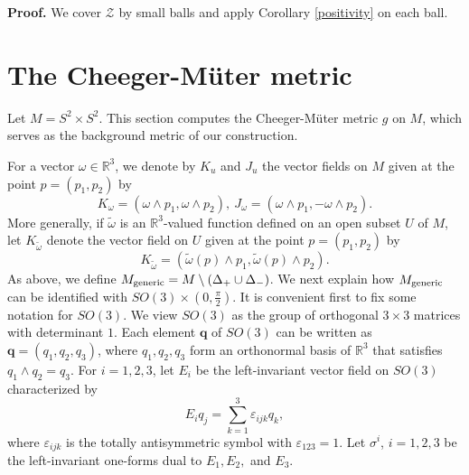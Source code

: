 \documentclass[11pt]{amsart}
\theoremstyle{definition}
\begin{document}
\textbf{Proof.} We cover $\mathcal{Z}$ by small balls and apply Corollary \ref{positivity} on each ball. \\

\section{The Cheeger-M\"uter metric}\label{sec:Mueter.metric}

Let $M = S^2 \times S^2$. This section computes the Cheeger-M\"uter metric $g$ on $M$, which serves as the background metric of our construction.

For a vector $\omega\in\mathbb{R}^3$, we denote by $K_u$ and $J_u$ the vector fields on $M$ given at the point $p=(p_1,p_2)$ by
\[
K_\omega = (\omega\wedge p_1, \omega\wedge p_2),\ J_\omega=(\omega\wedge p_1, -\omega\wedge p_2).
\]
More generally, if $\tilde{\omega}$ is an $\mathbb{R}^3$-valued function defined on an open subset $U$ of $M$, let $K_{\tilde{\omega}}$ denote the vector field on $U$ given at the point $p=(p_1,p_2)$ by
\[
K_{\tilde{\omega}}= (\tilde{\omega}(p)\wedge p_1,\tilde{\omega}(p)\wedge p_2).
\]
As above, we define $M_{\text{\rm generic}} = M \setminus (\Delta_+ \cup \Delta_-)$. We next explain how $M_{\text{\rm generic}}$ can be identified with $SO(3)\times (0,\frac{\pi}{2})$. It is convenient first to fix some notation for $SO(3)$.
We view $SO(3)$ as the group of orthogonal $3\times 3$ matrices with determinant $1$.
Each element $\mathbf{q}$ of $SO(3)$ can be written as $\mathbf{q}=(q_1,q_2,q_3)$, where $q_1,q_2,q_3$ form an orthonormal basis of $\mathbb{R}^3$ that satisfies $q_1\wedge q_2=q_3$.
For $i=1,2,3$, let $E_i$ be the left-invariant vector field on $SO(3)$ characterized by
\[
E_iq_j=\sum_{k=1}^3\varepsilon_{ijk}q_k,
\]
where $\varepsilon_{ijk}$ is the totally antisymmetric symbol with $\varepsilon_{123}=1$.
Let $\sigma^i$, $i=1,2,3$ be the left-invariant one-forms dual to $E_1, E_2,$ and $E_3$.
\end{document}
